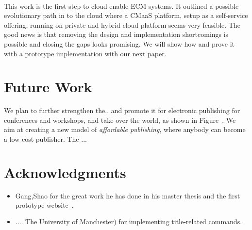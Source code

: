 \documentclass[EPiC]{easychair} %
\begin{document}
\paragraph{} This work is the first step to cloud enable ECM systems. It outlined a possible evolutionary path in to the cloud where a CMaaS platform, setup as a self-service offering, running on private and hybrid cloud platform seems very feasible. The good news is that removing the design and implementation shortcomings is possible and closing the gaps looks promising.  We will show how and prove it with a prototype implementation with our next paper. 
\section{Future Work}
\label{sect:future-work}

\paragraph{} We plan to further strengthen the..  and promote it for  electronic publishing for  conferences and workshops, and take over the world, as shown in Figure~. We aim at creating a new model of \emph{affordable publishing}, where anybody can become a low-cost publisher. The ... 

\section{Acknowledgments}
\label{sect:acks}

\begin{itemize}
    \item Gang,Shao for the great work he has done in his master thesis and the first prototype   website~\cite{gang-shao}.
    \item .... The University of Manchester) for implementing title-related commands.
\end{itemize}


\label{sec:bib}

%
%
%





\end{document}
